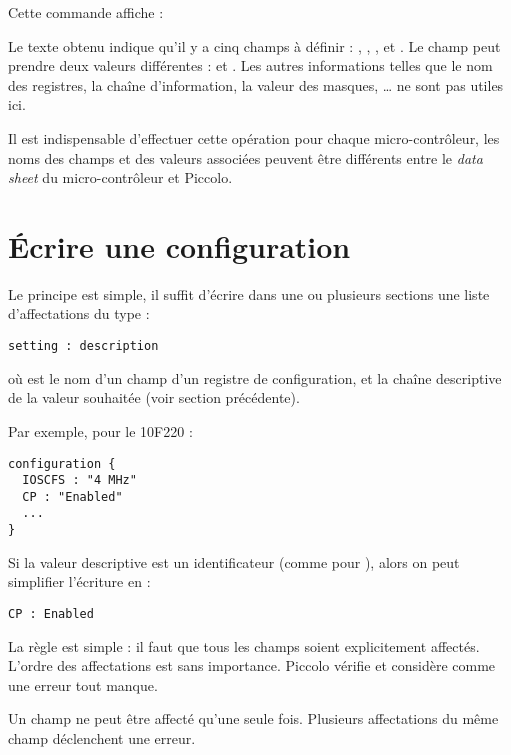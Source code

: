 Cette commande affiche :


Le texte obtenu indique qu'il y a cinq champs à définir : , , ,  et . Le champ  peut prendre deux valeurs différentes :  et . Les autres informations telles que le nom des registres, la chaîne d'information, la valeur des masques, … ne sont pas utiles ici.

Il est indispensable d'effectuer cette opération pour chaque micro-contrôleur, les noms des champs et des valeurs associées peuvent être différents entre le \emph{data sheet} du micro-contrôleur et Piccolo.

\section{Écrire une configuration}

Le principe est simple, il suffit d’écrire dans une ou plusieurs sections  une liste d’affectations du type :

\begin{lstlisting}[language=piccolo]
setting : description
\end{lstlisting}

où  est le nom d’un champ d’un registre de configuration, et  la chaîne descriptive de la valeur souhaitée (voir section précédente).

Par exemple, pour le 10F220 :

\begin{lstlisting}[language=piccolo]
configuration {
  IOSCFS : "4 MHz"
  CP : "Enabled"
  ...
}
\end{lstlisting}

Si la valeur descriptive est un identificateur (comme pour ), alors on peut simplifier l’écriture en :

\begin{lstlisting}[language=piccolo]
  CP : Enabled
\end{lstlisting}

La règle est simple : il faut que tous les champs soient explicitement affectés. L’ordre des affectations est sans importance. Piccolo vérifie et considère comme une erreur tout manque.

Un champ ne peut être affecté qu’une seule fois. Plusieurs affectations du même champ déclenchent une erreur.


